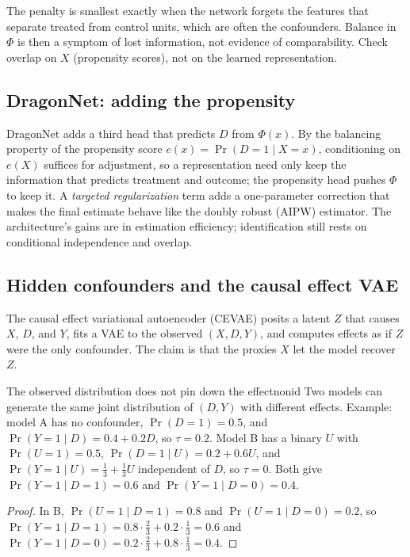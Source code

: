 \documentclass[11pt]{article}
\begin{document}
The penalty is smallest exactly when the network forgets the features that separate treated from control units,
which are often the confounders. Balance in $\Phi$ is then a symptom of lost information, not evidence of
comparability. Check overlap on $X$ (propensity scores), not on the learned representation.

\subsection{DragonNet: adding the propensity}

DragonNet adds a third head that predicts $D$ from $\Phi(x)$. By the balancing property of the propensity score
$e(x) = \Pr(D=1 \mid X=x)$, conditioning on $e(X)$ suffices for adjustment, so a representation need only keep the information that
predicts treatment and outcome; the propensity head pushes $\Phi$ to keep it. A \emph{targeted regularization} term adds
a one-parameter correction that makes the final estimate behave like the doubly robust (AIPW) estimator. The
architecture's gains are in estimation efficiency; identification still rests on conditional independence and
overlap.

\subsection{Hidden confounders and the causal effect VAE}

The causal effect variational autoencoder (CEVAE) posits a latent $Z$ that causes $X$, $D$, and $Y$, fits a VAE to the
observed $(X, D, Y)$, and computes effects as if $Z$ were the only confounder. The claim is that the proxies $X$ let
the model recover $Z$.

\begin{prop}{The observed distribution does not pin down the effect}{nonid}
Two models can generate the same joint distribution of $(D, Y)$ with different effects. Example: model A has no
confounder, $\Pr(D=1) = 0.5$, and $\Pr(Y=1 \mid D) = 0.4 + 0.2D$, so $\tau = 0.2$. Model B has a binary $U$ with
$\Pr(U=1) = 0.5$, $\Pr(D=1 \mid U) = 0.2 + 0.6U$, and $\Pr(Y=1 \mid U) = \tfrac13 + \tfrac13 U$ independent of $D$, so
$\tau = 0$. Both give $\Pr(Y=1 \mid D=1) = 0.6$ and $\Pr(Y=1 \mid D=0) = 0.4$.
\end{prop}
\begin{proof}
In B, $\Pr(U=1 \mid D=1) = 0.8$ and $\Pr(U=1 \mid D=0) = 0.2$, so $\Pr(Y=1 \mid D=1) = 0.8 \cdot \tfrac23 + 0.2 \cdot \tfrac13 = 0.6$
and $\Pr(Y=1 \mid D=0) = 0.2 \cdot \tfrac23 + 0.8 \cdot \tfrac13 = 0.4$.
\end{proof}
\end{document}
